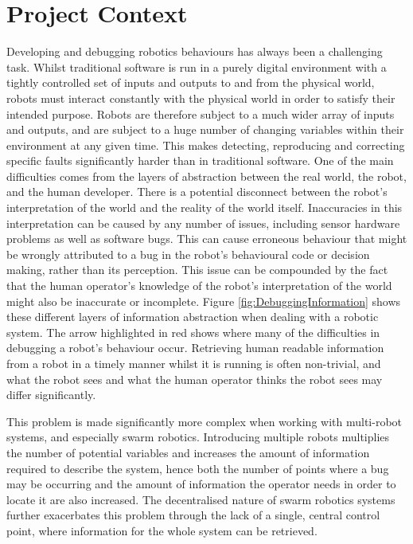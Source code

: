 
\section{Project Context} \label{ProjectContext}
Developing and debugging robotics behaviours has always been a challenging task. Whilst traditional software is run in a purely digital environment with a tightly controlled set of inputs and outputs to and from the physical world, robots must interact constantly with the physical world in order to satisfy their intended purpose. Robots are therefore subject to a much wider array of inputs and outputs, and are subject to a huge number of changing variables within their environment at any given time. This makes detecting, reproducing and correcting specific faults significantly harder than in traditional software. One of the main difficulties comes from the layers of abstraction between the real world, the robot, and the human developer. There is a potential disconnect between the robot's interpretation of the world and the reality of the world itself. Inaccuracies in this interpretation can be caused by any number of issues, including sensor hardware problems as well as software bugs. This can cause erroneous behaviour that might be wrongly attributed to a bug in the robot's behavioural code or decision making, rather than its perception. This issue can be compounded by the fact that the human operator's knowledge of the robot's interpretation of the world might also be inaccurate or incomplete. Figure \ref{fig:DebuggingInformation} shows these different layers of information abstraction when dealing with a robotic system. The arrow highlighted in red shows where many of the difficulties in debugging a robot's behaviour occur. Retrieving human readable information from a robot in a timely manner whilst it is running is often non-trivial, and what the robot sees and what the human operator thinks the robot sees may differ significantly.

This problem is made significantly more complex when working with multi-robot systems, and especially swarm robotics. Introducing multiple robots multiplies the number of potential variables and increases the amount of information required to describe the system, hence both the number of points where a bug may be occurring and the amount of information the operator needs in order to locate it are also increased. The decentralised nature of swarm robotics systems further exacerbates this problem through the lack of a single, central control point, where information for the whole system can be retrieved.

